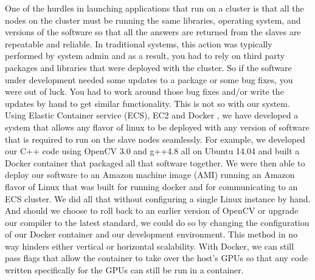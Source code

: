 One of the hurdles in launching applications that run on a cluster is that
all the nodes on the cluster must be running the same libraries, operating
system,  and versions of the software so that all the answers are returned from
the slaves are repeatable and reliable. In traditional systems, this action was
typically performed by system admin and as a result, you had to rely on third
party packages and libraries that were deployed with the cluster. So if the
software under development needed some updates to a package or some bug fixes,
you were out of luck. You had to work around those bug fixes and/or write the
updates by hand to get similar  functionality. This is not so with our system.
Using Elastic Container service (ECS), EC2 and Docker \cite{Merkel:2014:DLL:2600239.2600241}, we  have
developed a system that allows any flavor of linux to be deployed with any
version of software that is required to run on the slave nodes seamlessly. For
example, we developed our C++ code using OpenCV 3.0 and g++4.8 all on Ubuntu
14.04 and built a Docker container that packaged all that software together.
We were then able to deploy our software to an Amazon machine image (AMI) running
an Amazon flavor of Linux that was built for running docker and for communicating
to an ECS cluster. We did all that without configuring a single Linux instance
by hand. And should we choose to roll back to an earlier version of OpenCV or
upgrade our compiler to the latest standard, we could do so by changing the
configuration of our Docker container and our development environment. This
method in no way hinders either vertical or horizontal scalability. With Docker,
we can still pass flags that allow the container to take over the host's GPUs
so that any code written specifically for the GPUs can still be run in a container.




